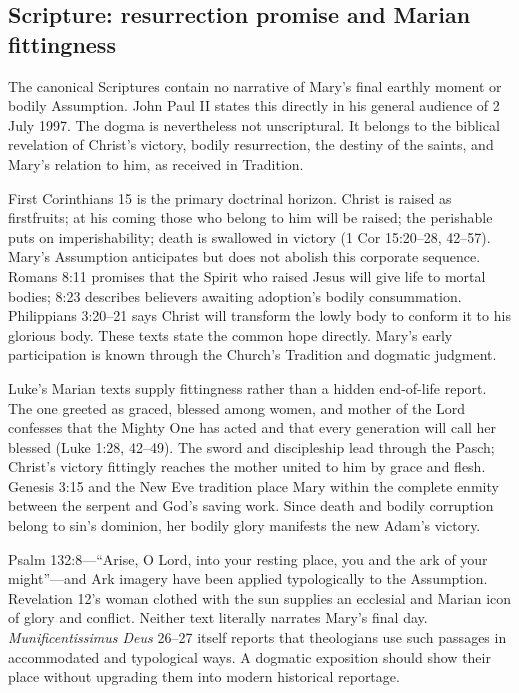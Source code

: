 \subsection{Scripture: resurrection promise and Marian fittingness}

The canonical Scriptures contain no narrative of Mary's final earthly moment or bodily Assumption. John Paul II states this directly in his general audience of 2 July 1997. The dogma is nevertheless not unscriptural. It belongs to the biblical revelation of Christ's victory, bodily resurrection, the destiny of the saints, and Mary's relation to him, as received in Tradition.

First Corinthians 15 is the primary doctrinal horizon. Christ is raised as firstfruits; at his coming those who belong to him will be raised; the perishable puts on imperishability; death is swallowed in victory (1 Cor 15:20--28, 42--57). Mary's Assumption anticipates but does not abolish this corporate sequence. Romans 8:11 promises that the Spirit who raised Jesus will give life to mortal bodies; 8:23 describes believers awaiting adoption's bodily consummation. Philippians 3:20--21 says Christ will transform the lowly body to conform it to his glorious body. These texts state the common hope directly. Mary's early participation is known through the Church's Tradition and dogmatic judgment.

Luke's Marian texts supply fittingness rather than a hidden end-of-life report. The one greeted as graced, blessed among women, and mother of the Lord confesses that the Mighty One has acted and that every generation will call her blessed (Luke 1:28, 42--49). The sword and discipleship lead through the Pasch; Christ's victory fittingly reaches the mother united to him by grace and flesh. Genesis 3:15 and the New Eve tradition place Mary within the complete enmity between the serpent and God's saving work. Since death and bodily corruption belong to sin's dominion, her bodily glory manifests the new Adam's victory.

Psalm 132:8---``Arise, O Lord, into your resting place, you and the ark of your might''---and Ark imagery have been applied typologically to the Assumption. Revelation 12's woman clothed with the sun supplies an ecclesial and Marian icon of glory and conflict. Neither text literally narrates Mary's final day. \emph{Munificentissimus Deus} 26--27 itself reports that theologians use such passages in accommodated and typological ways. A dogmatic exposition should show their place without upgrading them into modern historical reportage.

